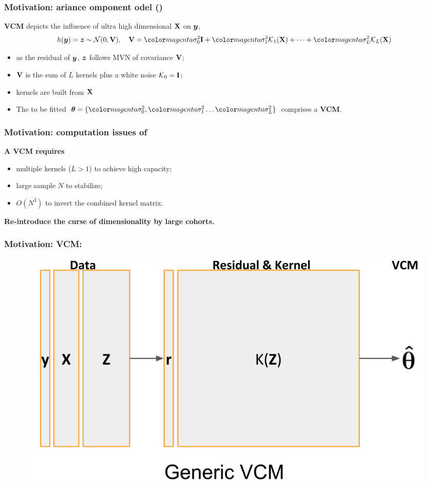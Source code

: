 \documentclass{beamer}
\begin{document}
\begin{frame}
  \frametitle{Motivation: ariance omponent
    odel ()} %
  \textbf{VCM} depicts the influence of ultra high dimensional $\mathbf{X}$
  on ${\bm{y}}$,
  \begin{align}\label{eq:vcm}
    h(\vy) = \vz \sim \mathcal{N}(0, \xv), \quad
    \xv = \fit{\sigma^2_0} \id + \fit{\sigma^2_1} \mck_1(\xx) + \dots + \fit{\sigma^2_L} \mck_L(\xx)
  \end{align}
  \begin{itemize}
  \item as the residual of ${\bm{y}}$, ${\bm{z}}$ follows MVN of covariance
    $\mathbf{V}$;
  \item $\mathbf{V}$ is the sum of $L$ kernels plus a white noise
    $\mathcal{K}_0 = \textbf{I}$;
  \item kernels are built from $\mathbf{X}$
  \item The to be fitted
    $\vtheta = \{\fit{\sigma^2_0}, \fit{\sigma^2_1} \dots
    \fit{\sigma^2_L}\}$ comprises a \textbf{VCM}.
  \end{itemize}
\end{frame}
\begin{frame}
  \frametitle{Motivation: computation issues of } %
  \textbf{A VCM requires}
  \begin{itemize}
  \item multiple kernels ($L>1$) to achieve high capacity;
  \item large sample $N$ to stabilize;
  \item $O(N^3)$ to invert the combined kernel matrix.
  \end{itemize}
  \textbf{Re-introduce the curse of dimensionality by large cohorts.}
\end{frame}
\begin{frame}\frametitle{Motivation: \textbf{VCM:}} %
  \begin{figure}\includegraphics[width=1\textwidth]{img/vcm_org}\end{figure}
\end{frame}
\end{document}
